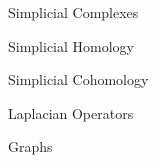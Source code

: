 \documentclass[../main.tex]{subfiles}
\begin{document}
    \begin{section}{Simplicial Complexes} 
            
    \end{section}
    \newpage
    \begin{section}{Simplicial Homology}
            
    \end{section}
    \newpage
    \begin{section}{Simplicial Cohomology}
         
    \end{section}
    \newpage
    \begin{section}{Laplacian Operators}
        
    \end{section}
    \newpage
    \begin{section}{Graphs}
        
    \end{section}
\end{document}
